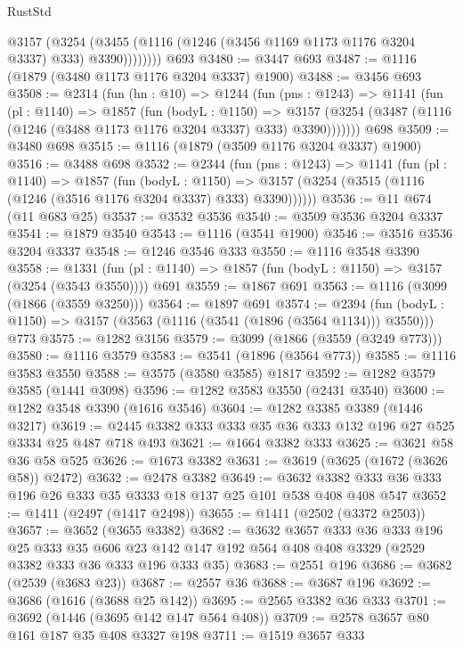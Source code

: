 \begin{lexlean}{RustStd}
\begin{coremodule}
            @3157
              (@3254 (@3455 (@1116 (@1246 (@3456 @1169 @1173 @1176 @3204 @3337) @333) @3390))))))))
    @693
@3480 := @3447 @693
@3487 := @1116 (@1879 (@3480 @1173 @1176 @3204 @3337) @1900)
@3488 := @3456 @693
@3508 := @2314
    (fun (hn : @10) =>
    @1244
      (fun (pns : @1243) =>
      @1141
        (fun (pl : @1140) =>
        @1857
          (fun (bodyL : @1150) =>
          @3157 (@3254 (@3487 (@1116 (@1246 (@3488 @1173 @1176 @3204 @3337) @333) @3390)))))))
    @698
@3509 := @3480 @698
@3515 := @1116 (@1879 (@3509 @1176 @3204 @3337) @1900)
@3516 := @3488 @698
@3532 := @2344
    (fun (pns : @1243) =>
    @1141
      (fun (pl : @1140) =>
      @1857
        (fun (bodyL : @1150) =>
        @3157 (@3254 (@3515 (@1116 (@1246 (@3516 @1176 @3204 @3337) @333) @3390))))))
@3536 := @11 @674 (@11 @683 @25)
@3537 := @3532 @3536
@3540 := @3509 @3536 @3204 @3337
@3541 := @1879 @3540
@3543 := @1116 (@3541 @1900)
@3546 := @3516 @3536 @3204 @3337
@3548 := @1246 @3546 @333
@3550 := @1116 @3548 @3390
@3558 := @1331 (fun (pl : @1140) => @1857 (fun (bodyL : @1150) => @3157 (@3254 (@3543 @3550)))) @691
@3559 := @1867 @691
@3563 := @1116 (@3099 (@1866 (@3559 @3250)))
@3564 := @1897 @691
@3574 := @2394
    (fun (bodyL : @1150) => @3157 (@3563 (@1116 (@3541 (@1896 (@3564 @1134))) @3550)))
    @773
@3575 := @1282 @3156
@3579 := @3099 (@1866 (@3559 (@3249 @773)))
@3580 := @1116 @3579
@3583 := @3541 (@1896 (@3564 @773))
@3585 := @1116 @3583 @3550
@3588 := @3575 (@3580 @3585) @1817
@3592 := @1282 @3579 @3585 (@1441 @3098)
@3596 := @1282 @3583 @3550 (@2431 @3540)
@3600 := @1282 @3548 @3390 (@1616 @3546)
@3604 := @1282 @3385 @3389 (@1446 @3217)
@3619 := @2445 @3382 @333 @333 @35 @36 @333 @132 @196 @27 @525 @3334 @25 @487 @718 @493
@3621 := @1664 @3382 @333
@3625 := @3621 @58 @36 @58 @525
@3626 := @1673 @3382
@3631 := @3619 (@3625 (@1672 (@3626 @58)) @2472)
@3632 := @2478 @3382
@3649 := @3632 @3382 @333 @36 @333 @196 @26 @333 @35 @3333 @18 @137 @25 @101 @538 @408 @408 @547
@3652 := @1411 (@2497 (@1417 @2498))
@3655 := @1411 (@2502 (@3372 @2503))
@3657 := @3652 (@3655 @3382)
@3682 := @3632
    @3657
    @333
    @36
    @333
    @196
    @25
    @333
    @35
    @606
    @23
    @142
    @147
    @192
    @564
    @408
    @408
    @3329
    (@2529 @3382 @333 @36 @333 @196 @333 @35)
@3683 := @2551 @196
@3686 := @3682 (@2539 (@3683 @23))
@3687 := @2557 @36
@3688 := @3687 @196
@3692 := @3686 (@1616 (@3688 @25 @142))
@3695 := @2565 @3382 @36 @333
@3701 := @3692 (@1446 (@3695 @142 @147 @564 @408))
@3709 := @2578 @3657 @80 @161 @187 @35 @408 @3327 @198
@3711 := @1519 @3657 @333

\end{coremodule}
\end{lexlean}
